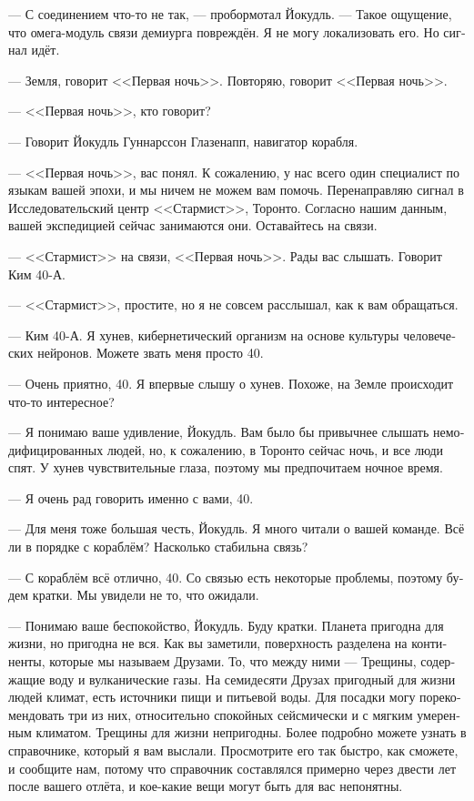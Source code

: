 \documentclass[a4paper,10pt,fleqn]{book}\usepackage{polyglossia}\setdefaultlanguage[babelshorthands=true]{russian}\setotherlanguage{english}\defaultfontfeatures{Ligatures=TeX,Mapping=tex-text}\usepackage{xcolor}\newcommand{\ml}[3]{#2}
\newcommand{\asterism}{\vspace{1em}{\centering\Large\bfseries$\ast~\ast~\ast$\par}\vspace{1em}}
\begin{document}
\asterism

--- С соединением что-то не так, --- пробормотал Йокудль.
--- Такое ощущение, что омега-модуль связи демиурга повреждён.
Я не могу локализовать его.
Но сигнал идёт.

\asterism

--- Земля, говорит <<Первая ночь>>.
Повторяю, говорит <<Первая ночь>>.

--- <<Первая ночь>>, кто говорит?

--- Говорит Йокудль Гуннарссон Глазенапп, навигатор корабля.

--- <<Первая ночь>>, вас понял.
К сожалению, у нас всего один специалист по языкам вашей эпохи, и мы ничем не можем вам помочь.
Перенаправляю сигнал в Исследовательский центр <<Стармист>>, Торонто.
Согласно нашим данным, вашей экспедицией сейчас занимаются они.
Оставайтесь на связи.

--- <<Стармист>> на связи, <<Первая ночь>>.
Рады вас слышать.
Говорит Ким 40-А.

--- <<Стармист>>, простите, но я не совсем расслышал, как к вам обращаться.

--- Ким 40-А.
Я хунев, кибернетический организм на основе культуры человеческих нейронов.
Можете звать меня просто 40.

--- Очень приятно, 40.
Я впервые слышу о хунев.
Похоже, на Земле происходит что-то интересное?

--- Я понимаю ваше удивление, Йокудль.
Вам было бы привычнее слышать немодифицированных людей, но, к сожалению, в Торонто сейчас ночь, и все люди спят.
У хунев чувствительные глаза, поэтому мы предпочитаем ночное время.

--- Я очень рад говорить именно с вами, 40.

--- Для меня тоже большая честь, Йокудль.
Я много читали о вашей команде.
Всё ли в порядке с кораблём?
Насколько стабильна связь?

--- С кораблём всё отлично, 40.
Со связью есть некоторые проблемы, поэтому будем кратки.
Мы увидели не то, что ожидали.

--- Понимаю ваше беспокойство, Йокудль.
Буду кратки.
Планета пригодна для жизни, но пригодна не вся.
Как вы заметили, поверхность разделена на континенты, которые мы называем Друзами.
То, что между ними --- Трещины, содержащие воду и вулканические газы.
На семидесяти Друзах пригодный для жизни людей климат, есть источники пищи и питьевой воды.
Для посадки могу порекомендовать три из них, относительно спокойных сейсмически и с мягким умеренным климатом.
Трещины для жизни непригодны.
Более подробно можете узнать в справочнике, который я вам выслали.
Просмотрите его так быстро, как сможете, и сообщите нам, потому что справочник составлялся примерно через двести лет после вашего отлёта, и кое-какие вещи могут быть для вас непонятны.
\end{document}
